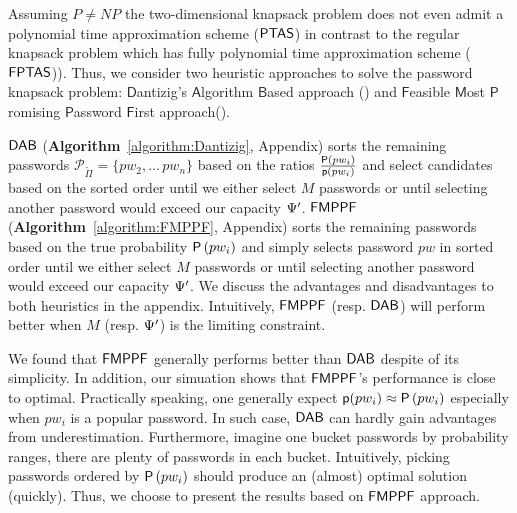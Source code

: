 Assuming $P\neq NP$ the two-dimensional knapsack problem does not even admit a polynomial time approximation scheme ($\mathsf{PTAS}$) \cite{kulik2010there} in contrast to the regular knapsack problem which has fully polynomial time approximation scheme ($\mathsf{FPTAS}$)). Thus, we consider two heuristic approaches to solve the password knapsack problem:  $\mathsf{D}$antizig's $\mathsf{A}$lgorithm $\mathsf{B}$ased\cite{Dan:OR57} approach (\DAB) and $\mathsf{F}$easible $\mathsf{M}$ost $\mathsf{P}$romising $\mathsf{P}$assword $\mathsf{F}$irst approach(\FMPPF).

$\mathsf{DAB}$ (\textbf{Algorithm}~\ref{algorithm:Dantizig}, Appendix) sorts the remaining passwords $\mathcal{P}_{\tilde{\Pi}} = \{pw_2, \ldots\, pw_n\}$ based on the ratios $\frac{\mathsf{P}\left(pw_i\right)}{\textsf{p}(pw_i)}$ and select candidates based on the sorted order until we either select $M$ passwords or until selecting another password would exceed our capacity $\Psi'$. $\mathsf{FMPPF}$ (\textbf{Algorithm}~\ref{algorithm:FMPPF}, Appendix) sorts the remaining passwords based on the true probability $\mathsf{P}\left(pw_i\right)$  and simply selects password $pw$ in sorted order until we either select $M$ passwords or until selecting another password would exceed our capacity $\Psi'$.  We discuss the advantages and disadvantages to both heuristics in the appendix. Intuitively, $\mathsf{FMPPF}$ (resp. $\mathsf{DAB}$) will perform better when $M$ (resp. $\Psi'$) is the limiting constraint.

We found that $\mathsf{FMPPF}$ generally performs better than $\mathsf{DAB}$ despite of its simplicity. In addition, our simuation shows that $\mathsf{FMPPF}$'s performance is close to optimal. Practically speaking, one generally expect $\textsf{p}(pw_i) \approx \mathsf{P}\left(pw_i\right)$ especially when $pw_i$ is a popular password. In such case, $\mathsf{DAB}$ can hardly gain advantages from underestimation. Furthermore, imagine one bucket passwords by probability ranges, there are plenty of passwords in each bucket. Intuitively, picking passwords ordered by $\mathsf{P}\left(pw_i\right)$ should produce an (almost) optimal solution (quickly). Thus, we choose to present the results based on $\mathsf{FMPPF}$ approach.

